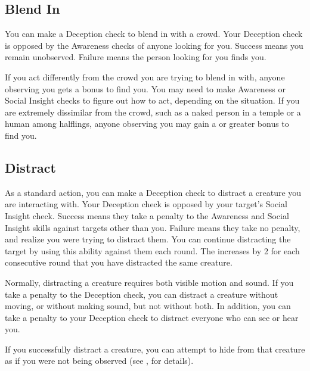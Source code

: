     \subsection{Blend In}
        You can make a Deception check to blend in with a crowd.
        Your Deception check is opposed by the Awareness checks of anyone looking for you.
        Success means you remain unobserved.
        Failure means the person looking for you finds you.

        If you act differently from the crowd you are trying to blend in with, anyone observing you gets a  bonus to find you. You may need to make Awareness or Social Insight checks to figure out how to act, depending on the situation. If you are extremely dissimilar from the crowd, such as a naked person in a temple or a human among halflings, anyone observing you may gain a  or greater bonus to find you.

    \subsection{Distract}\label{Distract}
        As a standard action, you can make a Deception check to distract a creature you are interacting with.
        Your Deception check is opposed by your target's Social Insight check.
        Success means they  take a  penalty to the Awareness and Social Insight skills against targets other than you.
        Failure means they take no penalty, and realize you were trying to distract them.
        You can continue distracting the target by using this ability against them each round.
        The  increases by 2 for each consecutive round that you have distracted the same creature.

        Normally, distracting a creature requires both visible motion and sound.
        If you take a  penalty to the Deception check, you can distract a creature without moving, or without making sound, but not without both.
        In addition, you can take a  penalty to your Deception check to distract everyone who can see or hear you.

        If you successfully distract a creature, you can attempt to hide from that creature as if you were not being observed (see , for details).

